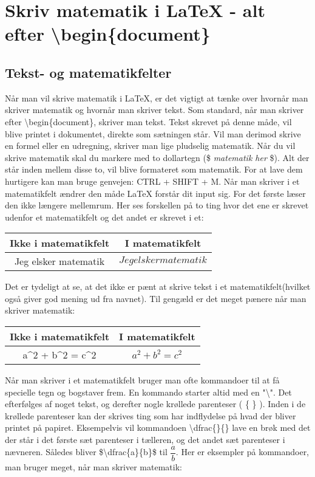 \section{Skriv matematik i \LaTeX{} - alt efter \textbackslash begin\{document\}}
\subsection{Tekst- og matematikfelter}
Når man vil skrive matematik i \LaTeX{}, er det vigtigt at tænke over hvornår man skriver matematik og hvornår man skriver tekst.
Som standard, når man skriver efter \textbackslash begin\{document\}, skriver man tekst.
Tekst skrevet på denne måde, vil blive printet i dokumentet, direkte som sætningen står.
Vil man derimod skrive en formel eller en udregning, skriver man lige pludselig matematik.
Når du vil skrive matematik skal du markere med to dollartegn (\$ \textit{matematik her} \$).
Alt der står inden mellem disse to, vil blive formateret som matematik.
For at lave dem hurtigere kan man bruge genvejen: CTRL + SHIFT + M.
Når man skriver i et matematikfelt ændrer den måde \LaTeX{} forstår dit input sig.
For det første læser den ikke længere mellemrum.
Her ses forskellen på to ting hvor det ene er skrevet udenfor et matematikfelt og det andet er skrevet i et:
\bigskip

\begin{center}
\begin{tabular}{|c|c|}
	\hline Ikke i matematikfelt & I matematikfelt\\ \hline
	Jeg elsker matematik & $Jeg elsker matematik$ \\ \hline
\end{tabular}
\end{center}

Det er tydeligt at se, at det ikke er pænt at skrive tekst i et matematikfelt(hvilket også giver god mening ud fra navnet).
Til gengæld er det meget pænere når man skriver matematik:
\bigskip

\begin{center}
\begin{tabular}{|c|c|}
	\hline Ikke i matematikfelt & I matematikfelt\\ \hline
	a\^{}2 + b\^{}2 = c\^{}2 & $a^2 + b^2 = c^2$ \\ \hline
\end{tabular}
\end{center}

Når man skriver i et matematikfelt bruger man ofte kommandoer til at få specielle tegn og bogstaver frem.
En kommando starter altid med en "\textbackslash ".
Det efterfølges af noget tekst, og derefter nogle krøllede parenteser ( \{ \} ).
Inden i de krøllede parenteser kan der skrives ting som har indflydelse på hvad der bliver printet på papiret.
Eksempelvis vil kommandoen \textbackslash dfrac\{\}\{\} lave en brøk med det der står i det første sæt parenteser i tælleren, og det andet sæt parenteser i nævneren.
Således bliver \$\textbackslash dfrac\{a\}\{b\}\$ til $\dfrac{a}{b}$.
Her er eksempler på kommandoer, man bruger meget, når man skriver matematik:
\bigskip

